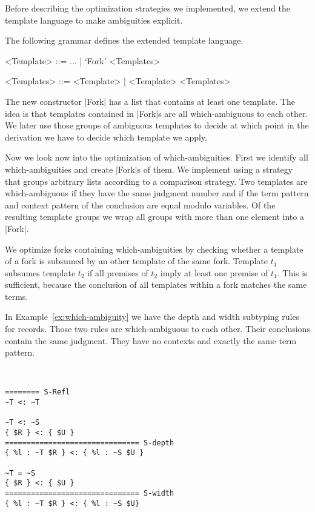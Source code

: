 Before describing the optimization strategies we implemented, we
extend the template language to make ambiguities explicit.

\begin{definition}
    The following grammar defines the extended template language.
    \begin{grammar}
    <Template> ::= $\dots$ | `Fork' <Templates>

    <Templates> ::= <Template> | <Template> <Templates>
    \end{grammar}
\end{definition}

The new constructor \code|Fork| has a list that contains at least one
template. The idea is that templates contained in \code|Fork|s are all
which-ambiguous to each other. We later use those groups of ambiguous
templates to decide at which point in the derivation we have to
decide which template we apply.

Now we look now into the optimization of which-ambiguities. First we
identify all which-ambiguities and create \code|Fork|s of them. We
implement using a strategy that groups arbitrary lists according to a
comparison strategy. Two templates are which-ambiguous
if they have the same judgment number and if the term pattern and
context pattern of the conclusion are equal modulo variables. Of the
resulting template groups we wrap all groups with more than one
element into a \code|Fork|.

We optimize forks containing which-ambiguities by checking whether a
template of a fork is subsumed by an other template of the same
fork. Template $t_1$ subsumes template $t_2$ if all premises of $t_2$
imply at least one premise of $t_1$. This is sufficient, because the
conclusion of all templates within a fork matches the same terms.

In Example~\ref{ex:which-ambiguity} we have the depth and width
subtyping rules for records. Those two rules are which-ambiguous to
each other. Their conclusions contain the same judgment. They have no
contexts and exactly the same term pattern.

\begin{example}{~}
\begin{lstlisting}[language=sltc]
======== S-Refl
~T <: ~T

~T <: ~S
{ $R } <: { $U }
=============================== S-depth
{ %l : ~T $R } <: { %l : ~S $U }

~T = ~S
{ $R } <: { $U }
=============================== S-width
{ %l : ~T $R } <: { %l : ~S $U}
\end{lstlisting}
\label{ex:which-ambiguity}
\end{example}

